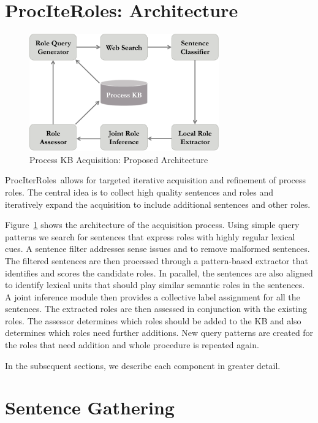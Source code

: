 
\newcommand{\sys}{ProcIterRoles}


\section{ProcIteRoles: Architecture}
\begin{figure}[hbt]
	\begin{center}
	\includegraphics[width=3.22in,height=1.99in]{figures/architecture} 	
	\caption{\label{fig:architecture} {Process KB Acquisition: Proposed Architecture}}
	\end{center}
\end{figure}
\sys\ allows for targeted iterative acquisition and refinement of process roles.
The central idea is to collect high quality sentences and roles and iteratively expand the acquisition to include
additional sentences and other roles. 

Figure~\ref{fig:architecture} shows the architecture of the acquisition process. 
Using simple query patterns we search for sentences that express roles with highly regular lexical cues. 
A sentence filter addresses sense issues and to remove malformed sentences.
The filtered sentences are then processed through a pattern-based extractor that identifies and scores the candidate roles. 
In parallel, the sentences are also aligned to identify lexical units that should play similar semantic roles in the sentences. 
A joint inference module then provides a collective label assignment for all the sentences. 
The extracted roles are then assessed in conjunction with the existing roles. 
The assessor determines which roles should be added to the KB and also determines which roles need further additions. 
New query patterns are created for the roles that need addition and whole procedure is repeated again. 

In the subsequent sections, we describe each component in greater detail.

\section{Sentence Gathering}

